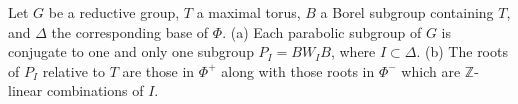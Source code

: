 Let $G$ be a reductive group, $T$ a maximal torus, $B$ a Borel subgroup containing $T$, and $\Delta$ the corresponding base of $\Phi$.
(a) Each parabolic subgroup of $G$ is conjugate to one and only one subgroup $P_I = B W_I B$, where $I \subset \Delta$.
(b) The roots of $P_I$ relative to $T$ are those in $\Phi^+$ along with those roots in $\Phi^{-}$ which are $\mathbb{Z}$-linear combinations of $I$.
